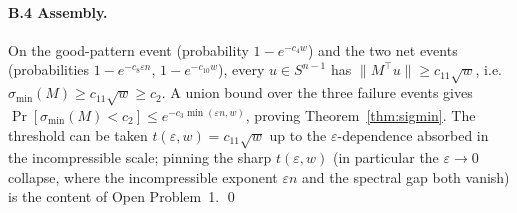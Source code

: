 \documentclass[11pt]{article}
\newcommand{\norm}[1]{\lVert #1 \rVert}
\newcommand{\sigmin}{\sigma_{\min}}
\theoremstyle{plain}
\theoremstyle{definition}
\begin{document}
\paragraph{B.4 Assembly.}
On the good-pattern event (probability $1-e^{-c_4 w}$) and the two net events
(probabilities $1-e^{-c_8\varepsilon n}$, $1-e^{-c_{10}w}$), every $u\in S^{n-1}$ has
$\norm{M^\top u}\ge c_{11}\sqrt w$, i.e.\ $\sigmin(M)\ge c_{11}\sqrt w\ge c_2$. A union bound
over the three failure events gives $\Pr[\sigmin(M)<c_2]\le e^{-c_3\min(\varepsilon n,w)}$,
proving Theorem~\ref{thm:sigmin}. The threshold can be taken $t(\varepsilon,w)=c_{11}\sqrt w$
up to the $\varepsilon$-dependence absorbed in the incompressible scale; pinning the sharp
$t(\varepsilon,w)$ (in particular the $\varepsilon\to0$ collapse, where the incompressible
exponent $\varepsilon n$ and the spectral gap both vanish) is the content of Open
Problem~1. \qed
\end{document}
